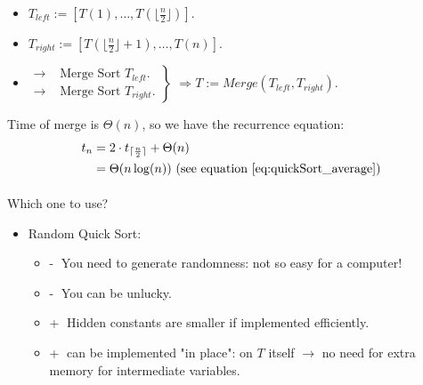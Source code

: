 \begin{itemize}
\renewcommand{\labelitemi}{$\bullet$}
	\item $T_{left} := [T(1), \ldots, T(\lfloor \frac{n}{2} \rfloor)]$.
	\item $T_{right}:= [T(\lfloor \frac{n}{2}\rfloor +1), \ldots, T(n)]$.
	\item $\left.
	\begin{array}{ll}
       \rightarrow & \text{ Merge Sort $T_{left}$}.\\
       \rightarrow &\text{ Merge Sort $T_{right}$}.
			\end{array}
  \right\}$ $\Rightarrow T := Merge\left(T_{left}, T_{right}\right)$.  
\end{itemize}

Time of merge is $\Theta(n)$, so we have the recurrence equation: 
\begin{align*}
t_n & = 2 \cdot t_{\lceil \frac{n}{2}\rceil}+ \Theta(n) \\
& = \Theta(n \log(n))  \text{ (see equation~\eqref{eq:quickSort_average})} \\
\end{align*}

\paragraph{}
Which one to use?
\begin{itemize}
\renewcommand{\labelitemi}{$\bullet$}
	\item Random Quick Sort:
	 \begin{itemize}
		\item \textcircled{-} You need to generate randomness: not so easy for a computer!
		\item \textcircled{-} You can be unlucky.	
		\item \textcircled{+} Hidden constants are smaller if implemented efficiently. 
		\item \textcircled{+} can be implemented "in place": on $T$ itself $\rightarrow$ no need for extra memory for intermediate variables.
	\end{itemize} 
	
\end{itemize}


